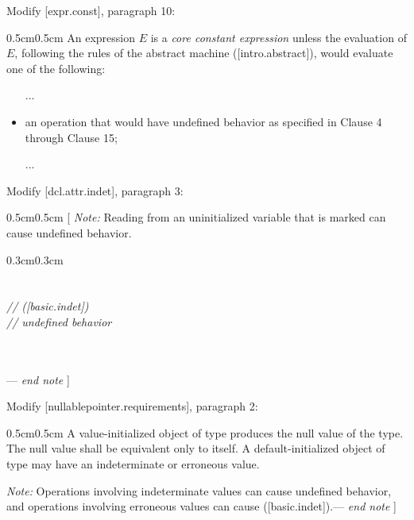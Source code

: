 Modify [expr.const], paragraph 10:

\begin{adjustwidth}{0.5cm}{0.5cm}
An expression $E$ is a \emph{core constant expression} unless the evaluation of $E$, following the rules of the abstract machine ([intro.abstract]), would evaluate one of the following:
\begin{itemize}
\item [...]
\item an operation that would have undefined behavior as specified in Clause 4 through Clause 15;
\item [...]
\end{itemize}
\end{adjustwidth}

Modify [dcl.attr.indet], paragraph 3:

\begin{adjustwidth}{0.5cm}{0.5cm}
[ \emph{Note:} Reading from an uninitialized variable that is marked \tcode{[[indeterminate]]} can cause undefined behavior.
\begin{adjustwidth}{0.3cm}{0.3cm}
\\
\\
\codetab {}\\
\codetab {} \codelongtab \emph{//  ([basic.indet])}\\
\codetab {} \codelongtab \emph{// undefined behavior}\\
\tcode{\}} \\
\\
\tcode{[...]}
\end{adjustwidth}
--- \emph{end note} ]
\end{adjustwidth}

Modify [nullablepointer.requirements], paragraph 2:

\begin{adjustwidth}{0.5cm}{0.5cm}
A value-initialized object of type  produces the null value of the type. The null value shall be equivalent only to itself. A default-initialized object of type  may have an indeterminate or erroneous value.

\emph{Note:} Operations involving indeterminate values can cause undefined behavior, and operations involving erroneous values can cause  ([basic.indet]).--- \emph{end note} ]
\end{adjustwidth}

